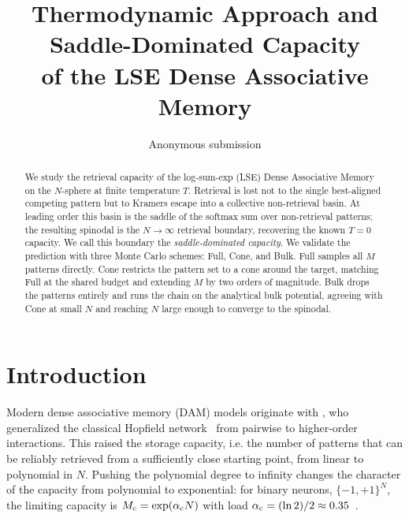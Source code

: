 \documentclass[letterpaper]{article} %
\title{\bfseries Thermodynamic Approach and Saddle-Dominated Capacity
\\of the LSE Dense Associative Memory}
\author{Anonymous submission}
\begin{document}
\maketitle

\begin{abstract}
We study the retrieval capacity of the log-sum-exp (LSE) Dense Associative Memory on the $N$-sphere at finite temperature $T$. Retrieval is lost not to the single best-aligned competing pattern but to Kramers escape into a collective non-retrieval basin. At leading order this basin is the saddle of the softmax sum over non-retrieval patterns; the resulting spinodal is the $N \to \infty$ retrieval boundary, recovering the known $T = 0$ capacity. We call this boundary the \textit{saddle-dominated capacity}. We validate the prediction with three Monte Carlo schemes: Full, Cone, and Bulk. Full samples all $M$ patterns directly. Cone restricts the pattern set to a cone around the target, matching Full at the shared budget and extending $M$ by two orders of magnitude. Bulk drops the patterns entirely and runs the chain on the analytical bulk potential, agreeing with Cone at small $N$ and reaching $N$ large enough to converge to the spinodal. 
\end{abstract}






\section{Introduction}

Modern dense associative memory (DAM) models originate with \citet{krotov2016dense}, who generalized the classical Hopfield network~\citep{Hopfield1982} from pairwise to higher-order interactions. This raised the storage capacity, i.e. the number of patterns that can be reliably retrieved from a sufficiently close starting point, from linear to polynomial in $N$. Pushing the polynomial degree to infinity changes the character of the capacity from polynomial to exponential: for binary neurons, $\{-1,+1\}^{N}$, the limiting capacity is $M_{\rm c} = \exp(\alpha_{\rm c} N)$ with load $\alpha_{\rm c} = (\ln 2)/2 \approx 0.35$~\citep{demircigil2017model}.
\end{document}
